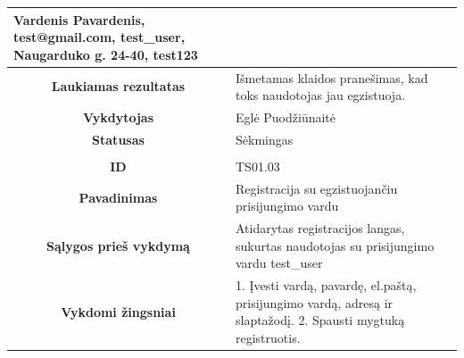 \documentclass{VUMIFPSkursinis}
\begin{document}
\begin{table}[H]
\begin{tabular}{|p{6cm}|p{11cm}|}
			{Vardenis Pavardenis, test@gmail.com, test\_user, Naugarduko g. 24-40, test123}\\
			\hline
			\multicolumn{1}{|c|}{{\bfseries Laukiamas rezultatas}}&
			{Išmetamas klaidos pranešimas, kad toks naudotojas jau egzistuoja.}\\
			\hline
			\multicolumn{1}{|c|}{{\bfseries Vykdytojas}}&
			{Eglė Puodžiūnaitė}\\
			\hline
			\multicolumn{1}{|c|}{{\bfseries Statusas}}&
			{Sėkmingas}\\
			\hline
			\rowcolor{lightgray}
			\multicolumn{2}{|c|}{}\\
			\hline
			\multicolumn{1}{|c|}{{\bfseries ID}}&
			{TS01.03}\\
			\hline
			\multicolumn{1}{|c|}{{\bfseries Pavadinimas}}&
			{Registracija su egzistuojančiu prisijungimo vardu}\\
			\hline
			\multicolumn{1}{|c|}{{\bfseries Sąlygos prieš vykdymą}}&
			{Atidarytas registracijos langas, sukurtas naudotojas su prisijungimo vardu test\_user}\\
			\hline
			\multicolumn{1}{|c|}{{\bfseries Vykdomi žingsniai}}&
			{1. Įvesti vardą, pavardę, el.paštą, prisijungimo vardą, adresą ir slaptažodį.
			 2. Spausti mygtuką registruotis.}\\
			\hline
		\end{tabular}
		\label{registracija}
	\end{table}			
\end{document}
